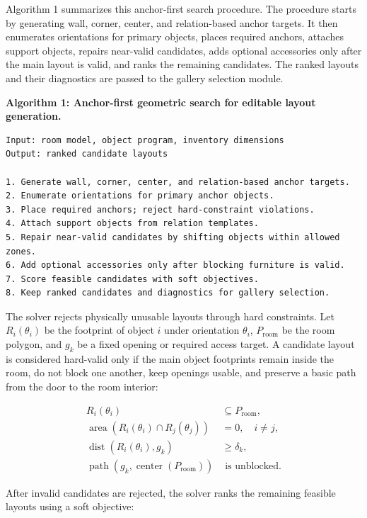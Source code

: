 Algorithm 1 summarizes this anchor-first search procedure. The procedure starts by generating wall, corner, center, and relation-based anchor targets. It then enumerates orientations for primary objects, places required anchors, attaches support objects, repairs near-valid candidates, adds optional accessories only after the main layout is valid, and ranks the remaining candidates. The ranked layouts and their diagnostics are passed to the gallery selection module.

\noindent\textbf{Algorithm 1: Anchor-first geometric search for editable layout generation.}

{\footnotesize
\begin{verbatim}
Input: room model, object program, inventory dimensions
Output: ranked candidate layouts

1. Generate wall, corner, center, and relation-based anchor targets.
2. Enumerate orientations for primary anchor objects.
3. Place required anchors; reject hard-constraint violations.
4. Attach support objects from relation templates.
5. Repair near-valid candidates by shifting objects within allowed zones.
6. Add optional accessories only after blocking furniture is valid.
7. Score feasible candidates with soft objectives.
8. Keep ranked candidates and diagnostics for gallery selection.
\end{verbatim}
}

The solver rejects physically unusable layouts through hard constraints. Let \(R_i(\theta_i)\) be the footprint of object \(i\) under orientation \(\theta_i\), \(P_{\mathrm{room}}\) be the room polygon, and \(g_k\) be a fixed opening or required access target. A candidate layout is considered hard-valid only if the main object footprints remain inside the room, do not block one another, keep openings usable, and preserve a basic path from the door to the room interior:

\begin{align*}
R_i(\theta_i) &\subseteq P_{\mathrm{room}}, \\
\operatorname{area}(R_i(\theta_i) \cap R_j(\theta_j)) &= 0, \quad i \neq j, \\
\operatorname{dist}(R_i(\theta_i), g_k) &\geq \delta_k, \\
\operatorname{path}(g_k, \operatorname{center}(P_{\mathrm{room}})) &\text{ is unblocked.}
\end{align*}

After invalid candidates are rejected, the solver ranks the remaining feasible layouts using a soft objective:

